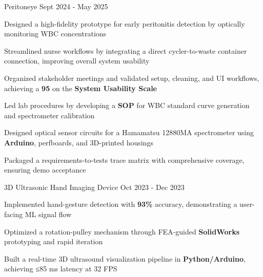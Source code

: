 \documentclass[11pt, a4paper]{russell}
\begin{document}
\begin{cventries}
\cvproject
  {Peritoneye} %
  {Sept 2024 - May 2025} %
  {
    \begin{cvitems}
        \item {Designed a high-fidelity prototype for early peritonitis detection by optically monitoring WBC concentrations}
        \item {Streamlined nurse workflows by integrating a direct cycler-to-waste container connection, improving overall system usability}
        \item {Organized stakeholder meetings and validated setup, cleaning, and UI workflows, achieving a \textbf{95} on the \textbf{System Usability Scale}} 
        \item {Led lab procedures by developing a \textbf{SOP} for WBC standard curve generation and spectrometer calibration}
        \item {Designed optical sensor circuits for a Hamamatsu 12880MA spectrometer using \textbf{Arduino}, perfboards, and 3D-printed housings}
        \item {Packaged a requirements-to-tests trace matrix with comprehensive coverage, ensuring demo acceptance}
    \end{cvitems}
  }

\cvproject
  {3D Ultrasonic Hand Imaging Device} %
  {Oct 2023 - Dec 2023} %
  {
    \begin{cvitems}
        \item {Implemented hand-gesture detection with \textbf{93\%} accuracy, demonstrating a user-facing ML signal flow}
        \item {Optimized a rotation-pulley mechanism through FEA-guided \textbf{SolidWorks} prototyping and rapid iteration}
        \item {Built a real-time 3D ultrasound visualization pipeline in \textbf{Python/Arduino}, achieving ≤85 ms latency at 32 FPS}
    \end{cvitems}
  }
\end{cventries}

\begin{cvskills}
\end{cvskills}

\vspace*{\fill}
\end{document}
